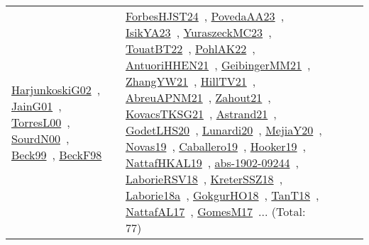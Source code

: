 {\begin{longtable}{lp{3cm}>{\raggedright\arraybackslash}p{6cm}>{\raggedright\arraybackslash}p{6cm}>{\raggedright\arraybackslash}p{8cm}}
\href{works/HarjunkoskiG02.pdf}{HarjunkoskiG02}~\cite{HarjunkoskiG02}, \href{works/JainG01.pdf}{JainG01}~\cite{JainG01}, \href{works/TorresL00.pdf}{TorresL00}~\cite{TorresL00}, \href{works/SourdN00.pdf}{SourdN00}~\cite{SourdN00}, \href{works/Beck99.pdf}{Beck99}~\cite{Beck99}, \href{works/BeckF98.pdf}{BeckF98}~\cite{BeckF98} & \href{works/ForbesHJST24.pdf}{ForbesHJST24}~\cite{ForbesHJST24}, \href{works/PovedaAA23.pdf}{PovedaAA23}~\cite{PovedaAA23}, \href{works/IsikYA23.pdf}{IsikYA23}~\cite{IsikYA23}, \href{works/YuraszeckMC23.pdf}{YuraszeckMC23}~\cite{YuraszeckMC23}, \href{works/TouatBT22.pdf}{TouatBT22}~\cite{TouatBT22}, \href{works/PohlAK22.pdf}{PohlAK22}~\cite{PohlAK22}, \href{works/AntuoriHHEN21.pdf}{AntuoriHHEN21}~\cite{AntuoriHHEN21}, \href{works/GeibingerMM21.pdf}{GeibingerMM21}~\cite{GeibingerMM21}, \href{works/ZhangYW21.pdf}{ZhangYW21}~\cite{ZhangYW21}, \href{works/HillTV21.pdf}{HillTV21}~\cite{HillTV21}, \href{works/AbreuAPNM21.pdf}{AbreuAPNM21}~\cite{AbreuAPNM21}, \href{works/Zahout21.pdf}{Zahout21}~\cite{Zahout21}, \href{works/KovacsTKSG21.pdf}{KovacsTKSG21}~\cite{KovacsTKSG21}, \href{works/Astrand21.pdf}{Astrand21}~\cite{Astrand21}, \href{works/GodetLHS20.pdf}{GodetLHS20}~\cite{GodetLHS20}, \href{works/Lunardi20.pdf}{Lunardi20}~\cite{Lunardi20}, \href{works/MejiaY20.pdf}{MejiaY20}~\cite{MejiaY20}, \href{works/Novas19.pdf}{Novas19}~\cite{Novas19}, \href{works/Caballero19.pdf}{Caballero19}~\cite{Caballero19}, \href{works/Hooker19.pdf}{Hooker19}~\cite{Hooker19}, \href{works/NattafHKAL19.pdf}{NattafHKAL19}~\cite{NattafHKAL19}, \href{works/abs-1902-09244.pdf}{abs-1902-09244}~\cite{abs-1902-09244}, \href{works/LaborieRSV18.pdf}{LaborieRSV18}~\cite{LaborieRSV18}, \href{works/KreterSSZ18.pdf}{KreterSSZ18}~\cite{KreterSSZ18}, \href{works/Laborie18a.pdf}{Laborie18a}~\cite{Laborie18a}, \href{works/GokgurHO18.pdf}{GokgurHO18}~\cite{GokgurHO18}, \href{works/TanT18.pdf}{TanT18}~\cite{TanT18}, \href{works/NattafAL17.pdf}{NattafAL17}~\cite{NattafAL17}, \href{works/GomesM17.pdf}{GomesM17}~\cite{GomesM17}... (Total: 77)\\

\end{longtable}}

